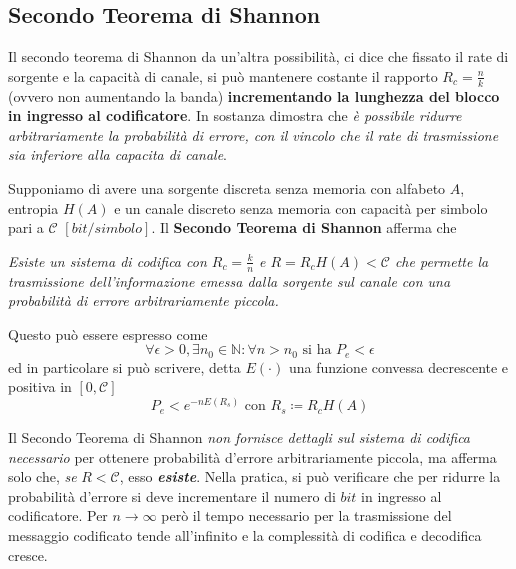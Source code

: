 \subsection{Secondo Teorema di Shannon}
Il secondo teorema di Shannon da un’altra possibilità, ci dice che fissato il rate di sorgente e la capacità di canale, si può mantenere costante il rapporto $R_c = \frac{n}{k}$ (ovvero non aumentando la banda) \textbf{incrementando la lunghezza del blocco in ingresso al codificatore}. In sostanza dimostra che \textit{è possibile ridurre arbitrariamente la probabilità di errore, con il vincolo che il rate di trasmissione sia inferiore alla capacita di canale}.

Supponiamo di avere una sorgente discreta senza memoria con alfabeto $A$, entropia $H(A)$ e un canale discreto senza memoria con capacità per simbolo pari a $\mathcal{C}$ $[bit/simbolo]$. Il \textbf{Secondo Teorema di Shannon} afferma che

\textit{Esiste un sistema di codifica con $R_c = \frac{k}{n}$ e $R = R_c H(A) < \mathcal{C}$ che permette la trasmissione dell’informazione emessa dalla sorgente sul canale con una probabilità di errore arbitrariamente piccola.}

Questo pu\`o essere espresso come
\begin{equation}
    \forall \epsilon > 0, \exists n_0 \in \mathbb{N}: \forall n > n_0 \text{ si ha } P_e < \epsilon 
\end{equation}
ed in particolare si pu\`o scrivere, detta $E(\cdot)$ una funzione  convessa decrescente e positiva in $[0,\mathcal{C}]$
\begin{equation}
    P_e < e^{-nE(R_s)} \text{ con }R_s \coloneqq R_c H(A)
\end{equation}

Il Secondo Teorema di Shannon \textit{non fornisce dettagli sul sistema di codifica necessario} per ottenere probabilità d’errore arbitrariamente piccola, ma afferma solo che, \textit{se} $R < \mathcal{C}$, esso \textit{\textbf{esiste}}. Nella pratica, si può verificare che per ridurre la probabilità d’errore si deve incrementare il numero di $bit$ in ingresso al codificatore. Per $n \to \infty$ per\`o il tempo necessario per la trasmissione del messaggio codificato tende all’infinito e la complessità di codifica e decodifica cresce.
